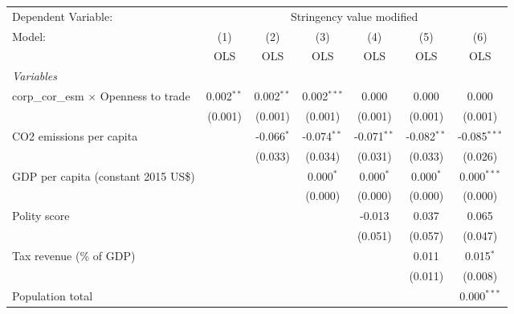 
\begingroup
\centering
\begin{tabular}{lcccccc}
   \toprule
   Dependent Variable: & \multicolumn{6}{c}{Stringency value modified}\\
   Model:                                       & (1)          & (2)          & (3)           & (4)           & (5)           & (6)\\  
                                                &  OLS         & OLS          & OLS           & OLS           & OLS           & OLS\\  
   \midrule
   \emph{Variables}\\
   corp\_cor\_esm $\times$ Openness to trade    & 0.002$^{**}$ & 0.002$^{**}$ & 0.002$^{***}$ & 0.000         & 0.000         & 0.000\\   
                                                & (0.001)      & (0.001)      & (0.001)       & (0.001)       & (0.001)       & (0.001)\\   
   CO2 emissions per capita                     &              & -0.066$^{*}$ & -0.074$^{**}$ & -0.071$^{**}$ & -0.082$^{**}$ & -0.085$^{***}$\\   
                                                &              & (0.033)      & (0.034)       & (0.031)       & (0.033)       & (0.026)\\   
   GDP per capita (constant 2015 US\$)          &              &              & 0.000$^{*}$   & 0.000$^{*}$   & 0.000$^{*}$   & 0.000$^{***}$\\   
                                                &              &              & (0.000)       & (0.000)       & (0.000)       & (0.000)\\   
   Polity score                                 &              &              &               & -0.013        & 0.037         & 0.065\\   
                                                &              &              &               & (0.051)       & (0.057)       & (0.047)\\   
   Tax revenue (\% of GDP)                      &              &              &               &               & 0.011         & 0.015$^{*}$\\   
                                                &              &              &               &               & (0.011)       & (0.008)\\   
   Population total                             &              &              &               &               &               & 0.000$^{***}$\\   

\end{tabular}
